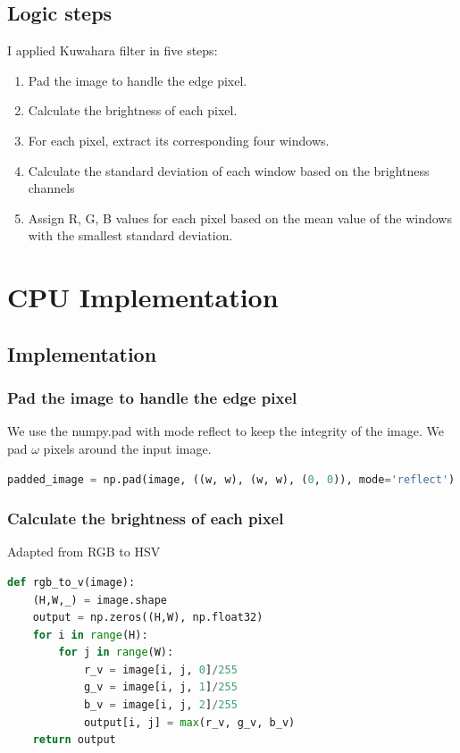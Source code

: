 \documentclass{article}
\begin{document}
\subsection{Logic steps}
I applied Kuwahara filter in five steps:

\begin{enumerate}
    \item Pad the image to handle the edge pixel.
    \item Calculate the brightness of each pixel. 
    \item For each pixel, extract its corresponding four windows.
    \item Calculate the standard deviation of each window based on the brightness channels
    \item Assign R, G, B values for each pixel based on the mean value of the windows with the smallest standard deviation.
\end{enumerate}

\section{CPU Implementation}
\subsection{Implementation}
\subsubsection{Pad the image to handle the edge pixel}

We use the numpy.pad with mode reflect to keep the integrity of the image. 
We pad $\omega$ pixels around the input image. 

\begin{lstlisting}[language=Python]
padded_image = np.pad(image, ((w, w), (w, w), (0, 0)), mode='reflect')
\end{lstlisting}

\subsubsection{Calculate the brightness of each pixel}
Adapted from RGB to HSV
\begin{lstlisting}[language=Python]
def rgb_to_v(image):
    (H,W,_) = image.shape
    output = np.zeros((H,W), np.float32)
    for i in range(H):
        for j in range(W):
            r_v = image[i, j, 0]/255
            g_v = image[i, j, 1]/255
            b_v = image[i, j, 2]/255
            output[i, j] = max(r_v, g_v, b_v)
    return output

\end{lstlisting}
\end{document}
